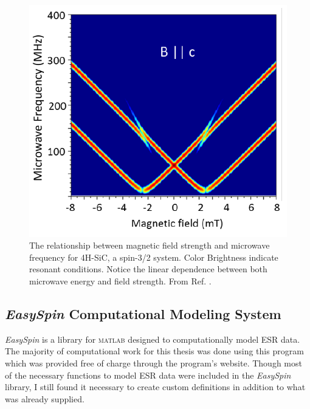 \documentclass[oneside]{BYUPhys}
\begin{document}
\begin{figure}[h]
    \centerline{\includegraphics{MFRelationship_fig}}
    \caption[Magnetic Field and Microwave Frequency Relationship]{\label{fig:MFRelationship}
     The relationship between magnetic field strength and microwave frequency for 4H-SiC, a spin-3/2 system.  Color Brightness indicate resonant conditions. Notice the linear dependence between both microwave energy and field strength. From Ref. .}
 \end{figure}

\subsection{\textit{EasySpin} Computational Modeling System}

\textit{EasySpin} \cite{RefWorks:doc:589299fbe4b0dec22aee3bd8} is a library for \textsc{matlab} designed to computationally model ESR data. The majority of computational work for this thesis was done using this program which was provided free of charge through the program's website. Though most of the necessary functions to model ESR data were included in the \textit{EasySpin} library, I still found it necessary to create custom definitions in addition to what was already supplied.
\end{document}
